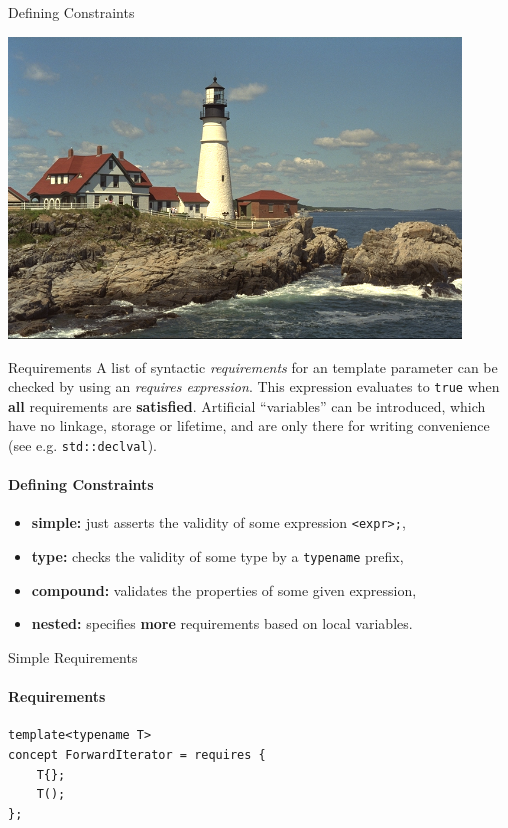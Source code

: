 \documentclass{beamer}
\begin{document}
    \begin{frame}[fragile]{Defining Constraints}
        \begin{center}
        \includegraphics[width=0.9\textwidth]{figures/defining.png}
        \end{center}
    \end{frame}

    \begin{frame}[fragile]{Requirements}
        A list of syntactic \emph{requirements} for an template parameter can be checked by using an \emph{requires expression}. This expression evaluates to \texttt{true} when \textbf{all} requirements are \textbf{satisfied}. Artificial ``variables'' can be introduced, which have no linkage, storage or lifetime, and are only there for writing convenience (see e.g. \texttt{std::declval}).
        \framesubtitle{Defining Constraints}
        \begin{itemize}
        \item{\textbf{simple:} just asserts the validity of some expression \texttt{<expr>;},}
        \item{\textbf{type:} checks the validity of some type by a \texttt{typename} prefix,}
        \item{\textbf{compound:} validates the properties of some given expression,}
        \item{\textbf{nested:} specifies \textbf{more} requirements based on local variables.}
        \end{itemize}
    \end{frame}

    \begin{frame}[fragile]{Simple Requirements}
        \framesubtitle{Requirements}
        \begin{center}
        \begin{lstlisting}[caption={simple requirements in an incomplete \texttt{ForwardIterator}.}]
template<typename T>
concept ForwardIterator = requires {
    T{};
    T();
};
\end{lstlisting}
        \end{center}
    \end{frame}
\end{document}
